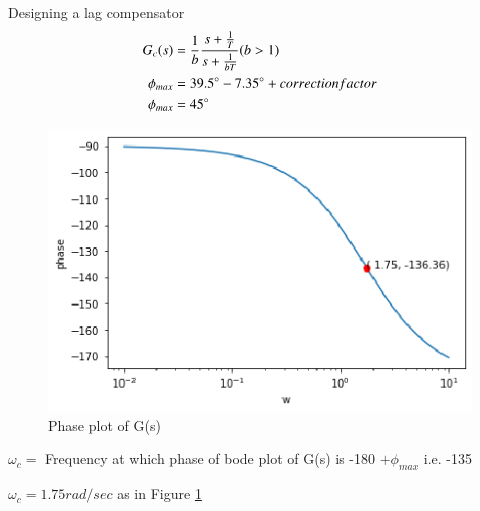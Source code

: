 Designing a lag compensator
\begin{align}
   G_{c}(s) &=  \frac{1}{b}\frac{s + \frac{1}{T}}{s + \frac{1}{bT}} (b>1)  \label{eq:ee18btech11001_11}
   \\
   \phi_{max}  &= 39.5\degree -7.35\degree + correction factor
   \\
   \phi_{max} &= 45 \degree
\end{align}
\begin{figure}[!ht]
\centering
    \includegraphics[width=\columnwidth]{./figs/ee18btech11001/ee18btech11001_3.eps}
  \caption{Phase plot of G(s)}
  \label{fig:ee18btech11001_fig2}
\end{figure}

$\omega_{c} = $ Frequency at which phase of bode plot of G(s) is -180 $+ \phi_{max}$ i.e. -135 \degree

$\omega_{c}  = 1.75 rad/sec$  as in Figure \ref{fig:ee18btech11001_fig2}

